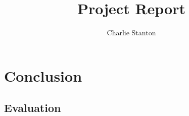 \documentclass[12pt,a4paper,titlepage]{article}
\title{Project Report}
\author{Charlie Stanton}
\begin{document}
    \maketitle

    

    

    

    

    \section{Conclusion}

    \subsection{Evaluation}

    
    
\end{document}
